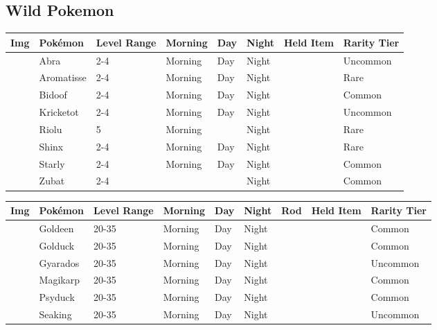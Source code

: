 \subsection{Wild Pokemon}%
\label{subsec:WildPokemon}%
\begin{longtable}{||l l l l l l l l||}%
\hline%
Img&Pokémon&Level Range&Morning&Day&Night&Held Item&Rarity Tier\\%
\hline%
\endhead%
\hline%
&Abra&2{-}4&Morning&Day&Night&&Uncommon\\%
\hline%
&Aromatisse&2{-}4&Morning&Day&Night&&Rare\\%
\hline%
&Bidoof&2{-}4&Morning&Day&Night&&Common\\%
\hline%
&Kricketot&2{-}4&Morning&Day&Night&&Uncommon\\%
\hline%
&Riolu&5&Morning&&Night&&Rare\\%
\hline%
&Shinx&2{-}4&Morning&Day&Night&&Rare\\%
\hline%
&Starly&2{-}4&Morning&Day&Night&&Common\\%
\hline%
&Zubat&2{-}4&&&Night&&Common\\%
\hline%
\end{longtable}%
\begin{longtable}{||l l l l l l l l l||}%
\hline%
Img&Pokémon&Level Range&Morning&Day&Night&Rod&Held Item&Rarity Tier\\%
\hline%
\endhead%
\hline%
&Goldeen&20{-}35&Morning&Day&Night&&&Common\\%
\hline%
&Golduck&20{-}35&Morning&Day&Night&&&Common\\%
\hline%
&Gyarados&20{-}35&Morning&Day&Night&&&Uncommon\\%
\hline%
&Magikarp&20{-}35&Morning&Day&Night&&&Common\\%
\hline%
&Psyduck&20{-}35&Morning&Day&Night&&&Common\\%
\hline%
&Seaking&20{-}35&Morning&Day&Night&&&Uncommon\\%
\hline%
\end{longtable}